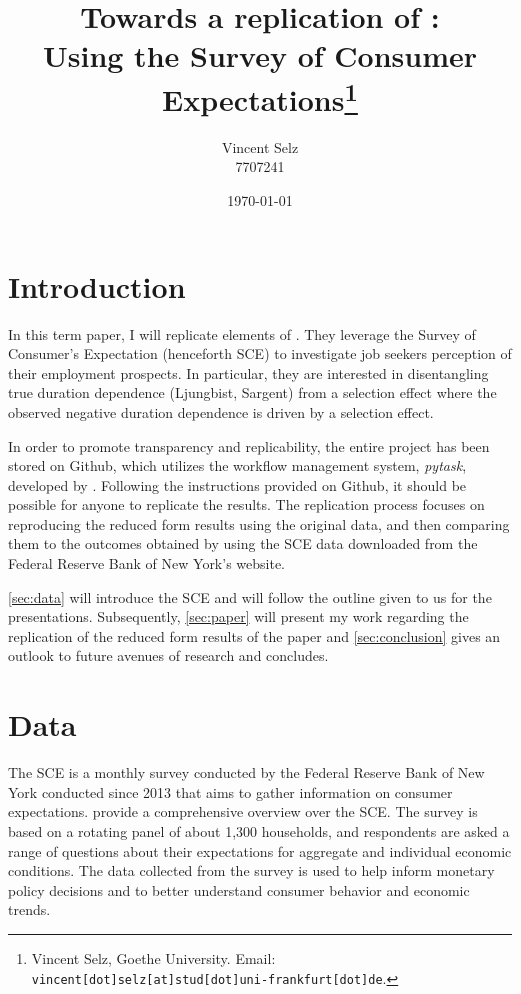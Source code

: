 \documentclass[11pt,a4paper,leqno]{article}
\title{Towards a replication of \textcite{MST2021}:  \\ Using the Survey of Consumer Expectations\thanks{Vincent Selz, Goethe University. Email: \texttt{vincent[dot]selz[at]stud[dot]uni-frankfurt[dot]de}. } }
\author{Vincent Selz \\ 7707241}
\date{
	\today
}
\begin{document}
\maketitle


\clearpage
\section{Introduction}



In this term paper, I will replicate elements of \textcite{MST2021}. They leverage the Survey of Consumer's Expectation (henceforth SCE) to investigate job seekers perception of their employment prospects. In particular, they are interested in disentangling true duration dependence (Ljungbist, Sargent) from a selection effect where the observed negative duration dependence is driven by a selection effect. 

In order to promote transparency and replicability, the entire project has been stored on Github, which utilizes the workflow management system, \textit{pytask}, developed by \textcite{Raabe2020}.  Following the instructions provided on Github, it should be possible for anyone  to replicate the results. The replication process focuses on reproducing the reduced form results using the original data, and then comparing them to the outcomes obtained by using the SCE data downloaded from the Federal Reserve Bank of New York's website.

\autoref{sec:data} will introduce the SCE and will  follow the outline given to us for the presentations. Subsequently,
\autoref{sec:paper} will present my work regarding the replication of the reduced form results of the paper and \autoref{sec:conclusion} gives an outlook to future avenues of research and concludes.

\section{Data} \label{sec:data}
The SCE is a monthly survey conducted by the Federal Reserve Bank of New York conducted since 2013 that aims to gather information on consumer expectations. \textcite{SCEOverview} provide a comprehensive overview over the SCE. The survey is based on a rotating panel of about 1,300 households, and respondents are asked a range of questions about their expectations for aggregate and individual economic conditions. The data collected from the survey is used to help inform monetary policy decisions and to better understand consumer behavior and economic trends.
\end{document}
